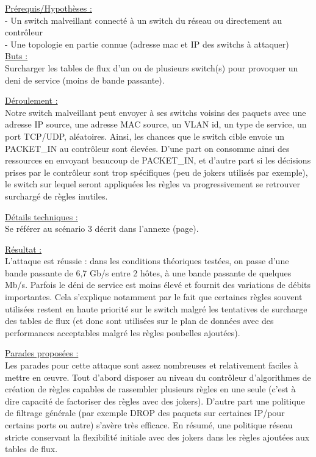 \underline{Prérequis/Hypothèses :}\\
- Un switch malveillant connecté à un switch du réseau ou directement au contrôleur\\
- Une topologie en partie connue (adresse mac et IP des switchs à attaquer)\\


\underline{Buts :}\\
Surcharger les tables de flux d’un ou de plusieurs switch(s) pour provoquer un deni de service (moins de bande passante).

\underline{Déroulement :}\\
Notre switch malveillant peut envoyer à ses switchs voisins des paquets avec une adresse IP source, une adresse MAC source, un VLAN id, un type de service, un port TCP/UDP, aléatoires. Ainsi, les chances que le switch cible envoie un PACKET\_IN au contrôleur sont élevées. D’une part on consomme ainsi des ressources en envoyant beaucoup de PACKET\_IN, et d’autre part si les décisions prises par le contrôleur sont trop spécifiques (peu de jokers utilisés par exemple), le switch sur lequel seront appliquées les règles va progressivement se retrouver surchargé de règles inutiles.

\underline{Détails techniques :}\\
Se référer au scénario 3 décrit dans l'annexe (page).

\underline{Résultat :}\\
L’attaque est réussie : dans les conditions théoriques testées, on passe d’une bande passante de 6,7 Gb/s entre 2 hôtes, à une bande passante de quelques Mb/s. Parfois le déni de service est moins élevé et fournit des variations de débits importantes. Cela s'explique notamment par le fait que certaines règles souvent utilisées restent en haute priorité sur le switch malgré les tentatives de surcharge des tables de flux (et donc sont utilisées sur le plan de données avec des performances acceptables malgré les règles poubelles ajoutées).

\underline{Parades proposées :}\\
Les parades pour cette attaque sont assez nombreuses et relativement faciles à mettre en œuvre. Tout d’abord disposer au niveau du contrôleur d’algorithmes de création de règles capables de rassembler plusieurs règles en une seule (c'est à dire capacité de factoriser des règles avec des jokers). D’autre part une politique de filtrage générale (par exemple DROP des paquets sur certaines IP/pour certains ports ou autre) s’avère très efficace. En résumé, une politique réseau stricte conservant la flexibilité initiale avec des jokers dans les règles ajoutées aux tables de flux.

